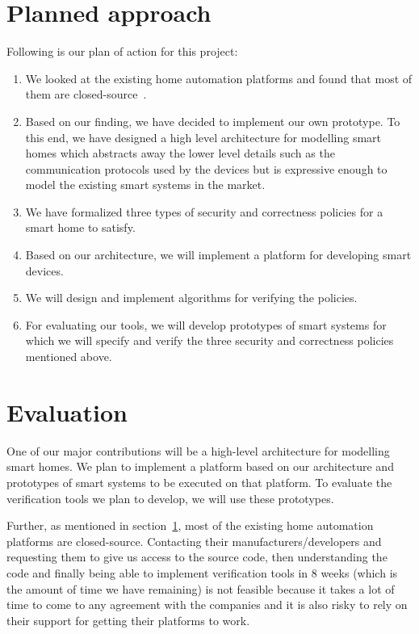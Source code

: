 \documentclass{article}
\begin{document}
\section{Planned approach}
\label{sec:plannedapp}
Following is our plan of action for this project:
\begin{enumerate}
\item We looked at the existing home automation platforms and found that most of them are closed-source~\cite{homeos, echo, wink, homekit, samsung}.  
\item Based on our finding, we have decided to implement our own prototype. To this end, we have designed a high level architecture for modelling smart homes which abstracts away the lower level details such as the communication protocols used by the devices but is expressive enough to model the existing smart systems in the market. 
\item  We have formalized three types of security and correctness policies for a smart home to satisfy. 
\item Based on our architecture, we will implement a platform for developing smart devices.
\item We will design and implement algorithms for verifying the policies.
\item For evaluating our tools, we will develop prototypes of smart systems for which we will specify and verify the three security and correctness policies mentioned above.
\end{enumerate}

\section{Evaluation}
One of our major contributions will be a high-level architecture for modelling smart homes. We plan to implement a platform based on our architecture and prototypes of smart systems to be executed on that platform. To evaluate the verification tools we plan to develop, we will use these prototypes. 

Further, as mentioned in section~\ref{sec:plannedapp}, most of the existing home automation platforms are closed-source. Contacting their manufacturers/developers and requesting them to give us access to the source code, then understanding the code and finally being able to implement verification tools in 8 weeks (which is the amount of time we have remaining) is not feasible because it takes a lot of time to come to any agreement with the companies and it is also risky to rely on their support for getting their platforms to work.    
\end{document}
